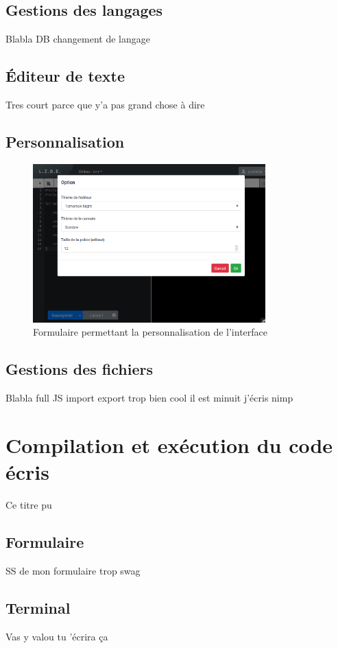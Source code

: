 \subsection{Gestions des langages}
Blabla DB changement de langage

\subsection{Éditeur de texte}
Tres court parce que y'a pas grand chose à dire

\subsection{Personnalisation}

\begin{figure}
\centering
\includegraphics[width=0.8\textwidth]{./frontend/example_personnalisation.png}
\caption{Formulaire permettant la personnalisation de l'interface}
\end{figure}

\subsection{Gestions des fichiers}
Blabla full JS import export trop bien cool il est minuit j'écris nimp

\section{Compilation et exécution du code écris}
Ce titre pu

\subsection{Formulaire}

SS de mon formulaire trop swag

\subsection{Terminal}

Vas y valou tu 'écrira ça
